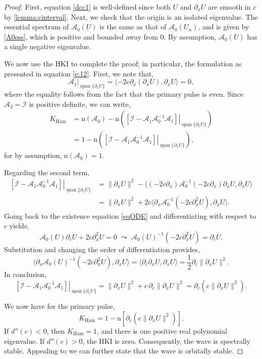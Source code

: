\documentclass[review,onefignum,onetabnum]{siamart171218}
\def\Ham{\mathop\mathrm{Ham}\nolimits}
\def\Span{\mathop\mathrm{span}\nolimits}
\newcommand{\rmn}{\mathrm{n}}
\newcommand{\calA}{\mathcal{A}}
\newcommand{\calI}{\mathcal{I}}
\begin{document}
\begin{proof}
First, equation \cref{dcc1} is well-defined since both $U$ and $\partial_x U$ are smooth in $c$ by \cref{lemma:cinterval}.
Next, we check that the origin is an isolated eigenvalue. The essential spectrum of $\calA_0(U)$ is the same as that of $\calA_0(U_n)$, and is given by \cref{A0ess}, which is positive and bounded away from 0. By assumption, $\calA_0(U)$ has a single negative eigenvalue.

We now use the HKI to complete the proof; in particular, the formulation as presented in equation \cref{e:12}. First, we note that,
\[
\left.\calA_1\right|_{\Span\{\partial_xU\}}=
\langle-2c\partial_x\left(\partial_xU\right),\partial_xU\rangle=0,
\]
where the equality follows from the fact that the primary pulse is even. Since $\calA_2=\calI$ is positive definite, we can write,
\[
\begin{aligned}
K_{\Ham}&=\rmn(\calA_0)-
\rmn\left(\left.\left[\calI-\calA_1\calA_0^{-1}\calA_1\right]\right|_{\Span\{\partial_xU\}}\right)\\
&=1-
\rmn\left(\left.\left[\calI-\calA_1\calA_0^{-1}\calA_1\right]\right|_{\Span\{\partial_xU\}}\right),
\end{aligned}
\]
for by assumption, $\rmn(\calA_0)=1$.

Regarding the second term,
\[
\begin{aligned}
\left.\left[\calI-\calA_1\calA_0^{-1}\calA_1\right]\right|_{\Span\{\partial_xU\}}&=
\|\partial_xU\|^2-
\langle(-2c\partial_x)\calA_0^{-1}(-2c\partial_x)\partial_xU,\partial_xU\rangle\\
&=\|\partial_xU\|^2+
2c\langle\partial_x\calA_0^{-1}(-2c\partial_x^2U),\partial_xU\rangle.
\end{aligned}
\]
Going back to the existence equation \cref{eqODE} and differentiating with respect to $c$ yields,
\[
\calA_0(U)\partial_cU+2c\partial_x^2U=0\,\,\leadsto\,\,
\calA_0(U)^{-1}(-2c\partial_x^2U)=\partial_cU.
\]
Substitution and changing the order of differentiation provides,
\[
\langle\partial_x\calA_0(U)^{-1}(-2c\partial_x^2U),\partial_xU\rangle=
\langle\partial_c\partial_xU,\partial_xU\rangle=\frac{1}{2}\partial_c\|\partial_xU\|^2.
\]
In conclusion,
\[
\left.\left[\calI-\calA_1\calA_0^{-1}\calA_1\right]\right|_{\Span\{\partial_xU\}}=
\|\partial_xU\|^2+c\,\partial_c\|\partial_xU\|^2=
\partial_c\left( c\|\partial_xU\|^2 \right).
\]

We now have for the primary pulse,
\[
K_{\Ham}=1-\rmn\left[\partial_c\left( c\|\partial_xU\|^2 \right)\right].
\]
If $d''(c)<0$, then $K_{\Ham}=1$, and there is one positive real polynomial eigenvalue. If $d''(c)>0$, the HKI is zero. Consequently, the wave is spectrally stable. Appealing to \cite[Theorem~4.1]{bronski:aii14} we can further state that the wave is orbitally stable.
\end{proof}
\end{document}
